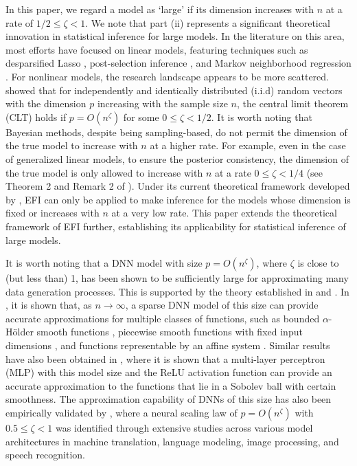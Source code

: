 \documentclass[11pt]{article}
\begin{document}
In this paper, we regard a model as `large' if its dimension increases with $n$ at a rate of $1/2\leq \zeta < 1$. 
We note that part (ii) represents a significant theoretical innovation in  statistical inference for large models.  
 In the literature on this area,  most efforts have focused on linear models, featuring techniques such as desparsified Lasso \citep{Javanmard2014,vandeGeer2014,ZhangZhang2014}, post-selection inference \citep{LeeTaylor2016}, 
 and Markov neighborhood regression \citep{LiangXJ2020MNR}.
For nonlinear models, the research landscape appears to be more scattered. 
\cite{Portnoy1986OnTC,Portnoy1988} showed that for independently and identically 
distributed (i.i.d) random vectors with the dimension $p$ increasing with the sample 
size $n$, the central limit theorem (CLT) holds if $p=O(n^{\zeta})$ for some $0\leq \zeta<1/2$. 
It is worth noting that Bayesian methods, despite being sampling-based, do 
not permit the dimension of the true model to increase with $n$ 
at a higher rate. For example, even in the case of generalized linear models, 
to ensure the posterior consistency, the dimension of the true model 
is only allowed to increase with $n$ at a rate $0 \leq \zeta< 1/4$ (see Theorem 2 and Remark 2 of \cite{jiang2007bayesian}).  
Under its current theoretical framework developed by \cite{LiangKS2024EFI}, 
EFI can only be applied to make inference for 
the models whose dimension is fixed or increases with $n$ at a very low rate. 
This paper extends the theoretical framework of EFI further, 
establishing its applicability for statistical inference of large models. 

It is worth noting that a DNN model with size $p=O(n^{\zeta})$, where $\zeta$ is close to (but less than) 1,  
has been shown to be sufficiently large for approximating many data generation processes. 
This is supported by the theory established in \cite{SunSLiang2021} and \cite{Farrell2021DeepNN}.
 In \cite{SunSLiang2021}, it is shown that, 
 as $n \to \infty$,
 a sparse DNN model of this size 
can provide accurate approximations for multiple classes 
of functions, such as bounded $\alpha$-H\"older smooth functions \citep{Schmidt-Hieber2017Nonparametric},  piecewise smooth functions with fixed input dimensions \citep{petersen2018optimal}, and functions representable  
by an affine system \citep{bolcskei2019optimal}. 
Similar results have also been obtained in 
 \cite{Farrell2021DeepNN}, where it is shown that a  
multi-layer perceptron (MLP) with this model size and the ReLU activation function   
can provide an accurate approximation to the functions that lie in a Sobolev ball with certain smoothness.  
The approximation capability of DNNs of this size has also been empirically 
validated by \cite{Hestness2017DeepLS},  where a neural 
scaling law of $p =O(n^{\zeta})$ with $0.5 \leq \zeta <1$ was 
identified through extensive studies across various model architectures in machine translation, language modeling, image processing, and speech recognition.
 
\end{document}
